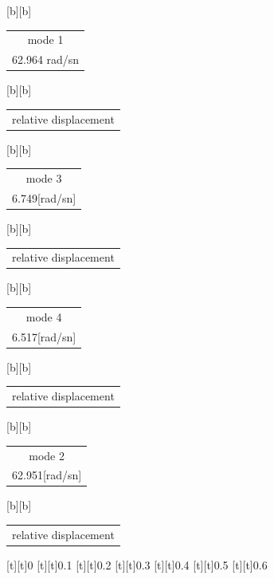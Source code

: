 %    
%
%
\begin{psfrags}%
\psfragscanon%
%
[b][b]{\color[rgb]{0,0,0}\setlength{\tabcolsep}{0pt}\begin{tabular}{c}mode 1\\62.964 rad/sn\end{tabular}}%
[b][b]{\color[rgb]{0,0,0}\setlength{\tabcolsep}{0pt}\begin{tabular}{c}relative displacement\end{tabular}}%
[b][b]{\color[rgb]{0,0,0}\setlength{\tabcolsep}{0pt}\begin{tabular}{c}mode 3\\6.749[rad/sn]\end{tabular}}%
[b][b]{\color[rgb]{0,0,0}\setlength{\tabcolsep}{0pt}\begin{tabular}{c}relative displacement\end{tabular}}%
[b][b]{\color[rgb]{0,0,0}\setlength{\tabcolsep}{0pt}\begin{tabular}{c}mode 4\\6.517[rad/sn]\end{tabular}}%
[b][b]{\color[rgb]{0,0,0}\setlength{\tabcolsep}{0pt}\begin{tabular}{c}relative displacement\end{tabular}}%
[b][b]{\color[rgb]{0,0,0}\setlength{\tabcolsep}{0pt}\begin{tabular}{c}mode 2\\62.951[rad/sn]\end{tabular}}%
[b][b]{\color[rgb]{0,0,0}\setlength{\tabcolsep}{0pt}\begin{tabular}{c}relative displacement\end{tabular}}%
%
[t][t]{0}%
[t][t]{0.1}%
[t][t]{0.2}%
[t][t]{0.3}%
[t][t]{0.4}%
[t][t]{0.5}%
[t][t]{0.6}%

\end{psfrags}
